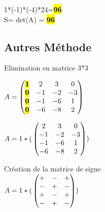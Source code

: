 \vspace{5mm} %

1*(-1)*(-4)*24=\hl{\textbf{96}} \\
\vspace{4mm} %
S= det(A) = \hl{\textbf{96}} \\

\subsection{Autres Méthode}

Elimination en matrice 3*3 \\

\vspace{5mm} %

$
A =
\begin{pmatrix}
  \hl{\textbf{1}} & 2 & 3 & 0   \\
  \hl{\textbf{0}} & -1 & -2 & -3   \\
  \hl{\textbf{0}} & -1 & -6 & 1 \\
  \hl{\textbf{0}} & -6 & -8 & 2 \\
\end{pmatrix}
$

\vspace{5mm} %

$
A = 1*( \\
  \begin{pmatrix}
     2 & 3 & 0   \\
    -1 & -2 & -3 \\
    -1 & -6 & 1  \\
    -6 & -8 & 2  \\
  \end{pmatrix}
)\\
$

\vspace{5mm} %

Création de la matrice de signe \\

$
A = 1*( \\
  \begin{pmatrix}
    + & - & +  \\
    - & + & -  \\
    + & - & +  \\
    - & + & -  \\
  \end{pmatrix}
)\\
$


